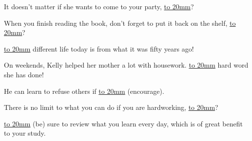 \item {
    It doesn't matter if she wants to come to your party, \underline{\hbox to 20mm{}}?
} 
\item {
    When you finish reading the book, don't forget to put it back on the shelf, \underline{\hbox to 20mm{}}?
} 
\item {
    \underline{\hbox to 20mm{}} different life today is from what it was fifty years ago!
} 
\item {
    On weekends, Kelly helped her mother a lot with housework. \underline{\hbox to 20mm{}} hard word she has done!
} 
\item {
    He can learn to refuse others if \underline{\hbox to 20mm{}} (encourage).
} 
\item {
    There is no limit to what you can do if you are hardworking,  \underline{\hbox to 20mm{}}?
} 
\item {
    \underline{\hbox to 20mm{}} (be) sure to review what you learn every day, which is of great benefit to your study.
} 